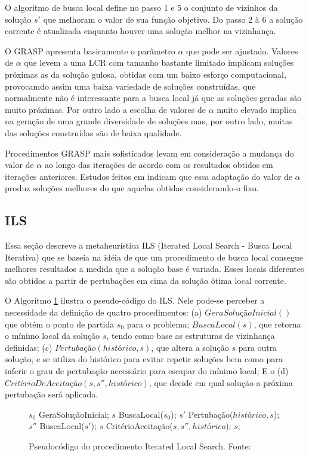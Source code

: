 O algoritmo de busca local define no passo 1 e 5 o conjunto de vizinhos da
solução $s{'}$ que melhoram o valor de sua função objetivo. Do passo 2 à 6 a
solução corrente é atualizada enquanto houver uma solução melhor na vizinhança.

O GRASP apresenta basicamente o parâmetro $\alpha$ que pode ser ajustado.
Valores de $\alpha$ que levem a uma LCR com tamanho bastante limitado implicam
soluções próximas as da solução gulosa, obtidas com um baixo esforço
computacional, provocamdo assim uma baixa variedade de soluções construídas, que
normalmente não é interessante para a busca local já que as soluções geradas
são muito próximas. Por outro lado a escolha de valores de $\alpha$ muito
elevado implica na geração de uma grande diversidade de soluções mas, por
outro lado, muitas das soluções construídas são de baixa qualidade.

Procedimentos GRASP mais sofisticados levam em consideração a mudança do valor
de $\alpha$ ao longo das iterações de acordo com os resultados obtidos em
iterações anteriores. Estudos feitos em \cite{prais2000} indicam que essa
adaptação do valor de $\alpha$ produz soluções melhores do que aquelas obtidas
considerando-o fixo.

\subsection{ILS}

Essa seção descreve a metaheurística ILS (Iterated Local Search - Busca Local
Iterativa) que se baseia na idéia de que um procedimento de busca local
consegue melhores resultados a medida que a solução base é variada.
Esses locais diferentes são obtidos a partir de pertubações em cima da solução
ótima local corrente.

O Algoritmo \ref{alg:ils} ilustra o pseudo-código do ILS. Nele pode-se perceber
a necessidade da definição de quatro procedimentos: (a) $GeraSoluçãoInicial()$
que obtém o ponto de partida $s_{0}$ para o problema; $BuscaLocal(s)$, que
retorna o mínimo local da solução $s$, tendo como base as estruturas de
vizinhança definidas; (c) $Pertubação(histórico, s)$, que altera a solução $s$
para outra solução, e se utiliza do histórico para evitar repetir soluções bem
como para inferir o grau de pertubação necessário para escapar do mínimo local;
E o (d) $CritérioDeAceitação(s, s{''}, histórico)$, que decide em qual solução
a próxima pertubação será aplicada.

\begin{figure}[h]
\caption{Pseudocódigo do procedimento Iterated Local Search. \newline
\mbox{Fonte:
\cite{notasmarcone}}}\label{alg:ils}
\begin{programma}
\STATE $s_{0}$ \GETS GeraSoluçãoInicial;
\STATE $s$ \GETS BuscaLocal($s_{0}$);
\STATE $s{'}$ \GETS Pertubação($histórico, s$);
\STATE $s{''}$ \GETS BuscaLocal($s{'}$);
\STATE $s$ \GETS CritérioAceitação($s, s{''}, histórico$);
\ENDWHILE
\STATE\RETURN $s$;
\ENDALGORITHM
\end{programma}
\end{figure}

